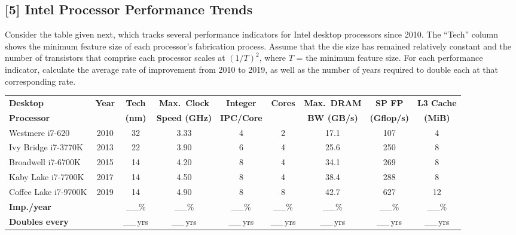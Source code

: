\problembreak %

\subsection{[5] Intel Processor Performance Trends}
\hypertarget{prob-1.6}{}
\medskip

\noindent Consider the table given next, which tracks several performance indicators for
Intel desktop processors since 2010. The ``Tech'' column shows the minimum
feature size of each processor's fabrication process. Assume that the die size
has remained relatively constant and the number of transistors that comprise
each processor scales at $(1/T)^2$, where $T$ = the minimum feature size. For
each performance indicator, calculate the average rate of improvement from
2010 to 2019, as well as the number of years required to double each at that
corresponding rate.

\begin{center}
\small
\begin{tabular}{lcccccccc}
\toprule
\textbf{Desktop}   & \textbf{Year} & \textbf{Tech} & \textbf{Max.\ Clock} &
\textbf{Integer}   & \textbf{Cores} & \textbf{Max.\ DRAM} &
\textbf{SP FP}     & \textbf{L3 Cache} \\
\textbf{Processor} & & \textbf{(nm)} & \textbf{Speed (GHz)} &
\textbf{IPC/Core}  & & \textbf{BW (GB/s)} &
\textbf{(Gflop/s)} & \textbf{(MiB)} \\
\midrule
Westmere i7-620      & 2010 & 32 & 3.33 & 4 & 2 & 17.1 & 107 & 4  \\
Ivy Bridge i7-3770K  & 2013 & 22 & 3.90 & 6 & 4 & 25.6 & 250 & 8  \\
Broadwell i7-6700K   & 2015 & 14 & 4.20 & 8 & 4 & 34.1 & 269 & 8  \\
Kaby Lake i7-7700K   & 2017 & 14 & 4.50 & 8 & 4 & 38.4 & 288 & 8  \\
Coffee Lake i7-9700K & 2019 & 14 & 4.90 & 8 & 8 & 42.7 & 627 & 12 \\
\midrule
\textbf{Imp./year}     & & \_\_\% & \_\_\% & \_\_\% & \_\_\% & \_\_\% & \_\_\% & \_\_\% \\
\textbf{Doubles every} & & \_\_\,yrs & \_\_\,yrs & \_\_\,yrs & \_\_\,yrs & \_\_\,yrs & \_\_\,yrs & \_\_\,yrs \\
\bottomrule
\end{tabular}
\end{center}

